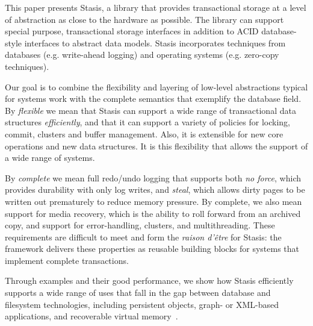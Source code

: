 \documentclass[letterpaper,twocolumn,10pt]{article}
\newcommand{\yad}{Stasis\xspace}
\newcommand{\eat}[1]{}
\begin{document}
\eat{
Examples of real world systems that currently fall into this category
are web search engines, document repositories, large-scale web-email
services, map and trip planning services, ticket reservation systems,
photo and video repositories, bioinformatics, version control systems,
work-flow applications, CAD/VLSI applications and directory services.

In short, we believe that a fundamental architectural shift in
transactional storage is necessary before general-purpose storage
systems are of practical use to modern applications.
Until this change occurs, databases' imposition of unwanted
abstraction upon their users will restrict system designs and
implementations.
}

This paper presents \yad, a library that provides transactional
storage at a level of abstraction as close to the hardware as
possible.  The library can support special purpose, transactional
storage interfaces in addition to ACID database-style interfaces to
abstract data models.  \yad incorporates techniques from databases
(e.g. write-ahead logging) and operating systems (e.g. zero-copy techniques).

Our goal is to combine the flexibility and layering of low-level
abstractions typical for systems work with the complete semantics
that exemplify the database field.
By {\em flexible} we mean that \yad{}  can support a wide
range of transactional data structures {\em efficiently}, and that it can support a variety
of policies for locking, commit, clusters and buffer management.
Also, it is extensible for new core operations
and new data structures. It is this flexibility that allows the
support of a wide range of systems.

By {\em complete} we mean full redo/undo logging that supports
both {\em no force}, which provides durability with only log writes,
and {\em steal}, which allows dirty pages to be written out prematurely
to reduce memory pressure. By complete, we also
mean support for media recovery, which is the ability to roll
forward from an archived copy, and support for error-handling,
clusters, and multithreading. These requirements are difficult
to meet and form the {\em raison d'\^etre} for \yad{}: the framework
delivers these properties as reusable building blocks for systems
that implement complete transactions.

Through examples and their good performance, we show how \yad{}
efficiently supports a wide range of uses that fall in the gap between 
database and filesystem technologies, including
persistent objects, graph- or XML-based applications, and recoverable
virtual memory~\cite{lrvm}.  
\end{document}
